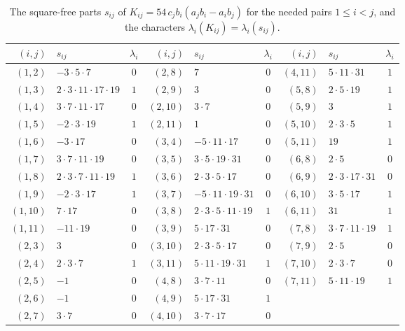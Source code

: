\begin{table}[htbp]
\centering
\caption{The square-free parts $s_{ij}$ of $K_{ij}=54\,c_jb_i(a_jb_i-a_ib_j)$ for the needed pairs $1\le i<j$, and the characters $\lambda_i(K_{ij})=\lambda_i(s_{ij})$.}\label{tab:r5-K}
\small
\setlength{\tabcolsep}{4pt}
\begin{tabular}{rlc@{\quad}rlc@{\quad}rlc}
\toprule
$(i,j)$ & $s_{ij}$ & $\lambda_i$ & $(i,j)$ & $s_{ij}$ & $\lambda_i$ & $(i,j)$ & $s_{ij}$ & $\lambda_i$\\
\midrule
$(1,2)$ & $-3\cdot 5\cdot 7$ & $0$ & $(2,8)$ & $7$ & $0$ & $(4,11)$ & $5\cdot 11\cdot 31$ & $1$ \\
$(1,3)$ & $2\cdot 3\cdot 11\cdot 17\cdot 19$ & $1$ & $(2,9)$ & $3$ & $0$ & $(5,8)$ & $2\cdot 5\cdot 19$ & $1$ \\
$(1,4)$ & $3\cdot 7\cdot 11\cdot 17$ & $0$ & $(2,10)$ & $3\cdot 7$ & $0$ & $(5,9)$ & $3$ & $1$ \\
$(1,5)$ & $-2\cdot 3\cdot 19$ & $1$ & $(2,11)$ & $1$ & $0$ & $(5,10)$ & $2\cdot 3\cdot 5$ & $1$ \\
$(1,6)$ & $-3\cdot 17$ & $0$ & $(3,4)$ & $-5\cdot 11\cdot 17$ & $0$ & $(5,11)$ & $19$ & $1$ \\
$(1,7)$ & $3\cdot 7\cdot 11\cdot 19$ & $0$ & $(3,5)$ & $3\cdot 5\cdot 19\cdot 31$ & $0$ & $(6,8)$ & $2\cdot 5$ & $0$ \\
$(1,8)$ & $2\cdot 3\cdot 7\cdot 11\cdot 19$ & $1$ & $(3,6)$ & $2\cdot 3\cdot 5\cdot 17$ & $0$ & $(6,9)$ & $2\cdot 3\cdot 17\cdot 31$ & $0$ \\
$(1,9)$ & $-2\cdot 3\cdot 17$ & $1$ & $(3,7)$ & $-5\cdot 11\cdot 19\cdot 31$ & $0$ & $(6,10)$ & $3\cdot 5\cdot 17$ & $1$ \\
$(1,10)$ & $7\cdot 17$ & $0$ & $(3,8)$ & $2\cdot 3\cdot 5\cdot 11\cdot 19$ & $1$ & $(6,11)$ & $31$ & $1$ \\
$(1,11)$ & $-11\cdot 19$ & $0$ & $(3,9)$ & $5\cdot 17\cdot 31$ & $0$ & $(7,8)$ & $3\cdot 7\cdot 11\cdot 19$ & $1$ \\
$(2,3)$ & $3$ & $0$ & $(3,10)$ & $2\cdot 3\cdot 5\cdot 17$ & $0$ & $(7,9)$ & $2\cdot 5$ & $0$ \\
$(2,4)$ & $2\cdot 3\cdot 7$ & $1$ & $(3,11)$ & $5\cdot 11\cdot 19\cdot 31$ & $1$ & $(7,10)$ & $2\cdot 3\cdot 7$ & $0$ \\
$(2,5)$ & $-1$ & $0$ & $(4,8)$ & $3\cdot 7\cdot 11$ & $0$ & $(7,11)$ & $5\cdot 11\cdot 19$ & $1$ \\
$(2,6)$ & $-1$ & $0$ & $(4,9)$ & $5\cdot 17\cdot 31$ & $1$ & & & \\
$(2,7)$ & $3\cdot 7$ & $0$ & $(4,10)$ & $3\cdot 7\cdot 17$ & $0$ & & & \\
\bottomrule
\end{tabular}
\end{table}

